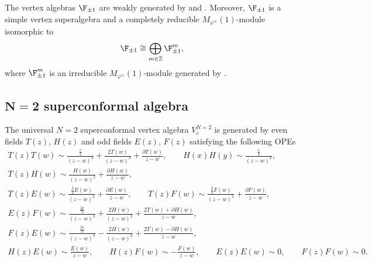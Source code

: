 The vertex algebras $\F_{\pm 1}$ are weakly generated by  and .
Moreover, $\F_{\pm 1}$ is a simple vertex superalgebra and a completely reducible $M_{\varphi^{\pm}} (1)$-module isomorphic to
\[
\F_{\pm 1} \cong \bigoplus_{m \in \mathbb{Z}} \F_{\pm 1}^m ,
\]
where $ \F_{\pm 1}^m$ is an irreducible $M_{\varphi^{\pm}} (1)$-module generated by .


\subsection[N=2 superconformal algebra]{$\boldsymbol{ N=2}$ superconformal algebra}

The universal $N=2$ superconformal vertex algebra $V^{N=2}_{c}$ is generated by even fields $T(z)$, $H(z)$ and odd fields $E(z)$, $F(z)$
satisfying the following OPEs
\begin{gather*}
 T(z)T(w) \sim \frac{\frac{c}{2}}{(z-w)^{4}}+\frac{2T(w)}{(z-w)^{2}} + \frac{\partial T(w)}{z-w}, \qquad H(x)H(y) \sim \frac{ \frac{c}{3}}{(z-w)^{2}}, \qquad \\
 T(z)H(w) \sim \frac{H(w)}{ (z-w)^{2}}+ \frac{\partial H(w)}{z-w}, \\
 T(z)E(w) \sim \frac{\frac{3}{2} E(w)}{(z-w)^{2}} + \frac{\partial E(w)}{z-w}, \qquad T(z)F(w) \sim \frac{\frac{3}{2} F(w)}{(z-w)^{2}} + \frac{\partial F(w)}{z-w}, \\
	E(z)F(w) \sim \frac{\frac{2c}{3}}{(z-w)^{3}}+\frac{2H(w)}{(z-w)^{2}} + \frac{2T(w) + \partial H(w)}{z-w}, \\
	F(z)E(w) \sim \frac{\frac{2c}{3}}{(z-w)^{3}}-\frac{2H(w)}{(z-w)^{2}} + \frac{2T(w) - \partial H(w)}{z-w}, \\
	H(z)E(w) \sim \frac{E(w)}{z-w}, \qquad H(z)F(w) \sim -\frac{F(w)}{z-w}, \qquad E(z)E(w) \sim 0, \qquad F(z)F(w) \sim 0. 	
\end{gather*}

